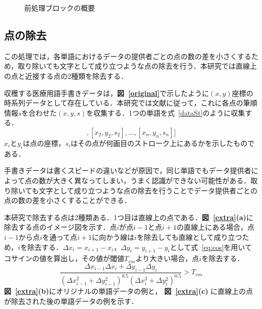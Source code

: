 \begin{figure}[tb]
 \begin{center}
  \caption{前処理ブロックの概要}
  \label{preprocess}
\end{center}
\end{figure}

\subsection{点の除去}
\label{remove_points}
この処理では，各単語におけるデータの提供者ごとの点の数の差を小さくするため，取り除いても文字として成り立つような点の除去を行う．本研究では直線上の点と近接する点の2種類を除去する．

収穫する医療用語手書きデータは，\textbf{図~\ref{original}}で示したように$(x, y)$座標の時系列データとして存在している．本研究では文献\cite{zhang18:drawing}に従って，これに各点の筆順情報$s$を合わせた$(x, y, s)$を収集する．1つの単語を式~\ref{dataSt}のように収集する．
\begin{equation}
 [[x_1, y_1, s_1], [x_2, y_2, s_2],..., [x_n, y_n, s_n]]
 \label{dataSt}
\end{equation}
$x_i$と$y_i$は点の座標，$s_i$はその点が何画目のストローク上にあるかを示したものである．

手書きデータは書くスピードの違いなどが原因で，同じ単語でもデータ提供者によって点の数が大きく異なってしまい，うまく認識ができない可能性がある．取り除いても文字として成り立つような点の除去を行うことでデータ提供者ごとの点の数の差を小さくすることができる．

本研究で除去する点は2種類ある．1つ目は直線上の点である．\textbf{図~\ref{extra}(a)}に除去する点のイメージ図を示す．点$i$が点$i-1$と点$i+1$の直線上にある場合，点$i-1$から点$i$を通って点$i+1$に向かう線は$i$を除去しても直線として成り立つため，$i$を除去する．$\Delta{x_i}=x_{i+1}-x_i$，$\Delta{y_i}=y_{i+1}-y_i$として式~\ref{eq:cos}を用いてコサインの値を算出し，その値が閾値$T_{cos}$より大きい場合，点$i$を除去する．
\begin{equation}
 \frac{\Delta{x_{i-1}}\Delta{x_i}+\Delta{y_{i-1}}\Delta{y_i}}
 {{(\Delta{x^2_{i-1}}+\Delta{y^2_{i-1}})}^{0.5} {(\Delta{x^2_i}+\Delta{y^2_i})}^{0.5}}
 >T_{cos}
  \label{eq:cos}
\end{equation}
\textbf{図~\ref{extra}(b)}にオリジナルの単語データの例と， \textbf{図~\ref{extra}(c)} に直線上の点が除去された後の単語データの例を示す．

